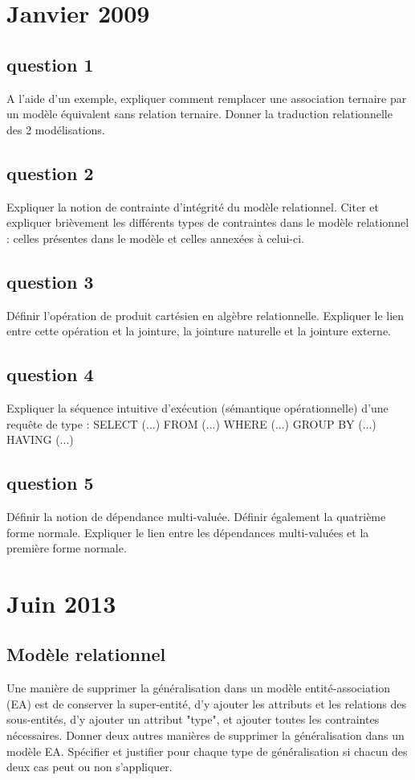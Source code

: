 \section{Janvier 2009}

\subsection{question 1}
A l’aide d’un exemple, expliquer comment remplacer une association ternaire par un modèle
équivalent sans relation ternaire. Donner la traduction relationnelle des 2 modélisations.

\subsection{question 2}
Expliquer la notion de contrainte d’intégrité du modèle relationnel. Citer et expliquer brièvement
les différents types de contraintes dans le modèle relationnel : celles présentes dans le modèle
et celles annexées à celui-ci.

\subsection{question 3}

Définir l’opération de produit cartésien en algèbre relationnelle. Expliquer le lien entre cette
opération et la jointure, la jointure naturelle et la jointure externe.

\subsection{question 4}
Expliquer la séquence intuitive d’exécution (sémantique opérationnelle) d’une requête de type :
SELECT (...) FROM (...) WHERE (...) GROUP BY (...) HAVING (...)

\subsection{question 5}
Définir la notion de dépendance multi-valuée. Définir également la quatrième forme normale.
Expliquer le lien entre les dépendances multi-valuées et la première forme normale.


\section{Juin 2013}

\subsection{Modèle relationnel}
Une manière de supprimer la généralisation dans un modèle entité-association (EA)
est de conserver la super-entité, d'y ajouter les attributs et les relations 
des sous-entités, d'y ajouter un attribut "type", et ajouter toutes les 
contraintes nécessaires. Donner deux autres manières de supprimer la 
généralisation dans un modèle EA. Spécifier et justifier pour chaque type de généralisation 
si chacun des deux cas peut ou non s'appliquer. 

